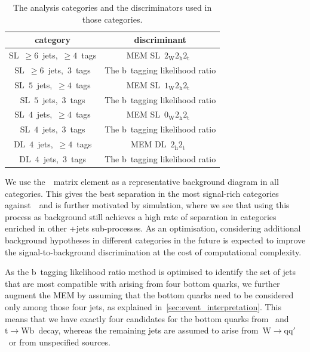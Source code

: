 \begin{table}[h!]
\begin{center}
\caption[The analysis categories for the~\ttHbb\xspace analysis.]{The analysis categories and the discriminators used in those categories.}
\label{tab:cat_discriminant}
\begin{tabular}{c|c}
\hline
category & discriminant \\
\hline
SL~$\geq6$~jets,~$\geq4$~tags & MEM SL~$2_{\mathrm{W}} 2_{\mathrm{h}} 2_{\mathrm{t}}$~\\
SL~$\geq6$~jets,~$3$~tags & The b~tagging likelihood ratio \\
\hline
SL~$5$~jets,~$\geq4$~tags & MEM SL~$1_{\mathrm{W}} 2_{\mathrm{h}} 2_{\mathrm{t}}$~\\
SL~$5$~jets,~$3$~tags & The b~tagging likelihood ratio \\
\hline
SL~$4$~jets,~$\geq4$~tags & MEM SL~$0_{\mathrm{W}} 2_{\mathrm{h}} 2_{\mathrm{t}}$~\\
SL~$4$~jets,~$3$~tags & The b~tagging likelihood ratio \\
\hline
DL~$4$~jets,~$\ge4$~tags & MEM DL~$2_{\mathrm{h}} 2_{\mathrm{t}}$~\\
DL~$4$~jets,~$3$~tags & The b~tagging likelihood ratio\\
\hline
\hline
\end{tabular}
\end{center}
\end{table}

We use the~\ttbb~matrix element as a representative background diagram in all categories. This gives the best separation in the most signal-rich categories against~\ttbb~and is further motivated by simulation, where we see that using this process as background still achieves a high rate of separation in categories enriched in other \ttbar+jets sub-processes. As an optimisation, considering additional background hypotheses in different categories in the future is expected to improve the signal-to-background discrimination at the cost of computational complexity.

As the b~tagging likelihood ratio method is optimised to identify the set of jets that are most compatible with arising from four bottom quarks, we further augment the MEM by assuming that the bottom quarks need to be considered only among those four jets, as explained in~\cref{sec:event_interpretation}. This means that we have exactly four candidates for the bottom quarks from \Hbb~and~$\mathrm{t} \rightarrow \mathrm{W} \mathrm{b}$~decay, whereas the remaining jets are assumed to arise from~$\mathrm{W} \rightarrow \mathrm{q} \mathrm{q}'$~or from unspecified sources. 

